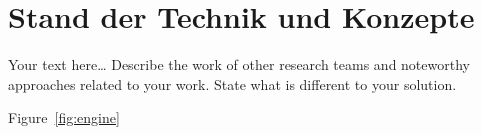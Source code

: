 \chapter{Stand der Technik und Konzepte}
\label{chap:related}
\chapterstart

Your text here\ldots 
Describe the work of other research teams and noteworthy approaches related to your work. State what is different to your solution.


Figure~\ref{fig:engine}






\chapterend